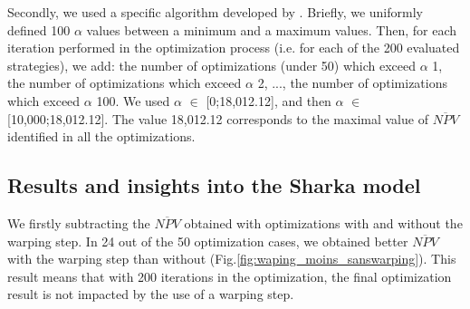 Secondly, we used a specific algorithm developed by . Briefly, we uniformly defined 100 $\alpha$ values between a minimum and a maximum values. 
Then, for each iteration performed in the optimization process (i.e. for each of the 200 evaluated strategies), we add: 
the number of optimizations (under 50) which exceed $\alpha$ 1, the number of optimizations which exceed $\alpha$ 2, ..., 
the number of optimizations which exceed $\alpha$ 100. We used $\alpha$ $\in$ [0;18,012.12], and then $\alpha$ $\in$ [10,000;18,012.12]. 
The value 18,012.12 corresponds to the maximal value of $\overline{NPV}$ identified in all the optimizations.

\subsection{Results and insights into the Sharka model}

We firstly subtracting the $\overline{NPV}$ obtained with optimizations with and without the warping step. 
In 24 out of the 50 optimization cases, we obtained better $\overline{NPV}$ with the warping step than without (Fig.\ref{fig:waping_moins_sanswarping}). 
This result means that with 200 iterations in the optimization, the final optimization result is not impacted by the use of a warping step.

